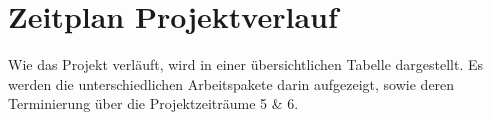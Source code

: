 \section{Zeitplan Projektverlauf}
Wie das Projekt verläuft, wird in einer übersichtlichen Tabelle dargestellt. Es werden die unterschiedlichen Arbeitspakete darin aufgezeigt, sowie deren Terminierung über die Projektzeiträume 5 \& 6.